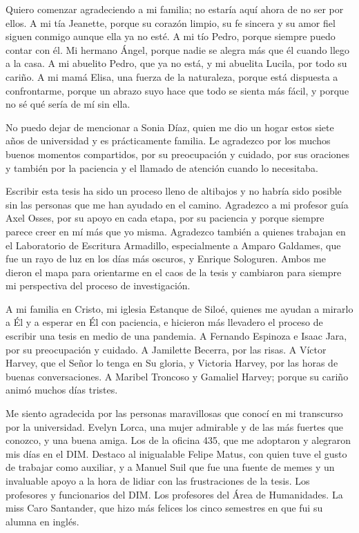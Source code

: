 \documentclass[upright, contnum]{umemoria}
\begin{document}
\begin{thanks}

Quiero comenzar agradeciendo a mi familia; no estaría aquí ahora de no ser por ellos. A mi tía Jeanette, porque su corazón limpio, su fe sincera y su amor fiel siguen conmigo aunque ella ya no esté. A mi tío Pedro, porque siempre puedo contar con él. Mi hermano Ángel, porque nadie se alegra más que él cuando llego a la casa. A mi abuelito Pedro, que ya no está, y mi abuelita Lucila, por todo su cariño. A mi mamá Elisa, una fuerza de la naturaleza, porque está dispuesta a confrontarme, porque un abrazo suyo hace que todo se sienta más fácil, y porque no sé qué sería de mí sin ella.

No puedo dejar de mencionar a Sonia Díaz, quien me dio un hogar estos siete años de universidad y es prácticamente familia. Le agradezco por los muchos buenos momentos compartidos, por su preocupación y cuidado, por sus oraciones y también por la paciencia y el llamado de atención cuando lo necesitaba. 

Escribir esta tesis ha sido un proceso lleno de altibajos y no habría sido posible sin las personas que me han ayudado en el camino. Agradezco a mi profesor guía Axel Osses, por su apoyo en cada etapa, por su paciencia y porque siempre parece creer en mí más que yo misma. Agradezco también a quienes trabajan en el Laboratorio de Escritura Armadillo, especialmente a Amparo Galdames, que fue un rayo de luz en los días más oscuros, y Enrique Sologuren. Ambos me dieron el mapa para orientarme en el caos de la tesis y cambiaron para siempre mi perspectiva del proceso de investigación.

A mi familia en Cristo, mi iglesia Estanque de Siloé, quienes me ayudan a mirarlo a Él y a esperar en Él con paciencia, e hicieron más llevadero el proceso de escribir una tesis en medio de una pandemia. A Fernando Espinoza e Isaac Jara, por su preocupación y cuidado. A Jamilette Becerra, por las risas. A Víctor Harvey, que el Señor lo tenga en Su gloria, y Victoria Harvey, por las horas de buenas conversaciones. A Maribel Troncoso y Gamaliel Harvey; porque su cariño animó muchos días tristes.

Me siento agradecida por las personas maravillosas que conocí en mi transcurso por la universidad. Evelyn Lorca, una mujer admirable y de las más fuertes que conozco, y una buena amiga. Los de la oficina 435, que me adoptaron y alegraron mis días en el DIM. Destaco al inigualable Felipe Matus, con quien tuve el gusto de trabajar como auxiliar, y a Manuel Suil que fue una fuente de memes y un invaluable apoyo a la hora de lidiar con las frustraciones de la tesis. Los profesores y funcionarios del DIM. Los profesores del Área de Humanidades. La miss Caro Santander, que hizo más felices los cinco semestres en que fui su alumna en inglés. 


\end{thanks}
\end{document}

